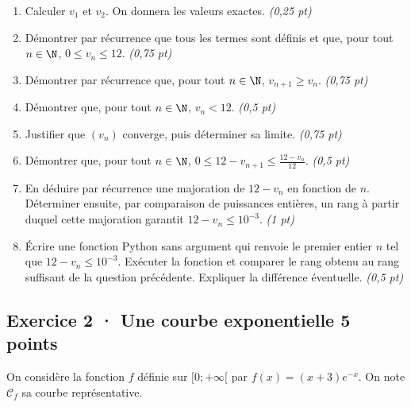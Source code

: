 \begin{enumerate}

\item Calculer $v_1$ et $v_2$. On donnera les valeurs exactes. \hfill\textit{(0,25 pt)}

\item Démontrer par récurrence que tous les termes sont définis et que, pour tout $n\in\N$, $0\le v_n\le12$. \hfill\textit{(0,75 pt)}

\item Démontrer par récurrence que, pour tout $n\in\N$, $v_{n+1}\ge v_n$. \hfill\textit{(0,75 pt)}

\item Démontrer que, pour tout $n\in\N$, $v_n<12$. \hfill\textit{(0,5 pt)}

\item Justifier que $(v_n)$ converge, puis déterminer sa limite. \hfill\textit{(0,75 pt)}

\item Démontrer que, pour tout $n\in\N$, $0\le 12-v_{n+1}\le\frac{12-v_n}{12}$. \hfill\textit{(0,5 pt)}

\item En déduire par récurrence une majoration de $12-v_n$ en fonction de $n$. Déterminer ensuite, par comparaison de puissances entières, un rang à partir duquel cette majoration garantit $12-v_n\le10^{-3}$. \hfill\textit{(1 pt)}

\item Écrire une fonction Python sans argument qui renvoie le premier entier $n$ tel que $12-v_n\le10^{-3}$. Exécuter la fonction et comparer le rang obtenu au rang suffisant de la question précédente. Expliquer la différence éventuelle. \hfill\textit{(0,5 pt)}

\end{enumerate}

\subsection*{Exercice 2 · Une courbe exponentielle \hfill 5 points}On considère la fonction $f$ définie sur $[0;+\infty[$ par $f(x)=(x+3)e^{-x}$. On note $\mathcal C_f$ sa courbe représentative.

